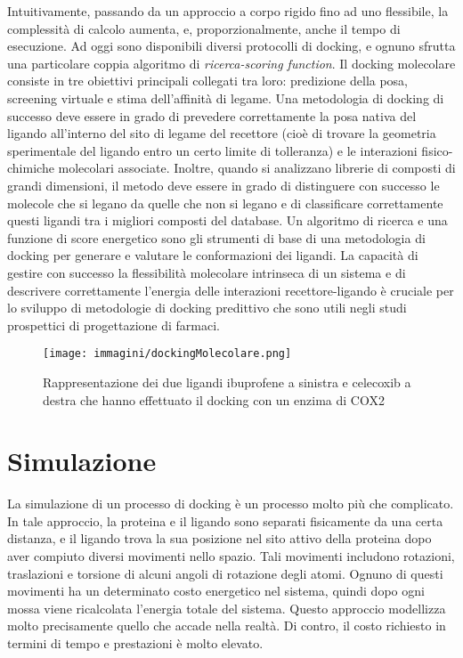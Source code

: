 Intuitivamente, passando da un approccio a corpo rigido fino ad uno flessibile, la complessità di calcolo aumenta, e, proporzionalmente, anche il tempo di esecuzione.\newline
Ad oggi sono disponibili diversi protocolli di docking, e ognuno sfrutta una particolare coppia algoritmo di \textit{ricerca-scoring function}.\newline
Il docking molecolare consiste in tre obiettivi principali collegati tra loro: predizione della posa, screening virtuale e stima dell'affinità di legame. Una metodologia di docking di successo deve essere in grado di prevedere correttamente la posa nativa del ligando all'interno del sito di legame del recettore (cioè di trovare la geometria sperimentale del ligando entro un certo limite di tolleranza) e le interazioni fisico-chimiche molecolari associate. Inoltre, quando si analizzano librerie di composti di grandi dimensioni, il metodo deve essere in grado di distinguere con successo le molecole che si legano da quelle che non si legano e di classificare correttamente questi ligandi tra i migliori composti del database. Un algoritmo di ricerca e una funzione di score energetico sono gli strumenti di base di una metodologia di docking per generare e valutare le conformazioni dei ligandi. La capacità di gestire con successo la flessibilità molecolare intrinseca di un sistema e di descrivere correttamente l'energia delle interazioni recettore-ligando è cruciale per lo sviluppo di metodologie di docking predittivo che sono utili negli studi prospettici di progettazione di farmaci\cite{guedes2014receptor}.

\begin{figure}[H]
    \centering
    \texttt{[image: immagini/dockingMolecolare.png]}
    \caption{Rappresentazione dei due ligandi ibuprofene a sinistra e celecoxib a destra che hanno effettuato il docking con un enzima di COX2}
    \label{fig:Docking Molecolare}
\end{figure}

\section{Simulazione}
La simulazione di un processo di docking è un processo molto più che complicato. In tale approccio, la proteina e il ligando sono separati fisicamente da una certa distanza, e il ligando trova la sua posizione nel sito attivo della proteina dopo aver compiuto diversi movimenti nello spazio. Tali movimenti includono rotazioni, traslazioni e torsione di
alcuni angoli di rotazione degli atomi. Ognuno di questi movimenti ha un determinato costo energetico nel sistema, quindi dopo ogni mossa viene ricalcolata l'energia totale del sistema. Questo approccio modellizza molto precisamente quello che accade nella realtà. Di contro, il costo richiesto in termini di tempo e prestazioni è molto elevato.
    
